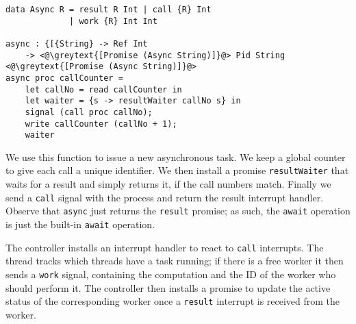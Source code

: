 \documentclass[msc,deptreport,cs]{infthesis} %
\newcommand{\code}[1]{\lstinline{#1}}
\newcommand{\greytext}[1]{\textcolor{black!40}{#1}}
\newcommand{\todo}[1]
           {{\par\noindent\small\color{RoyalPurple}
  \framebox{\parbox{\dimexpr\linewidth-2\fboxsep-2\fboxrule}
    {\textbf{TODO:} #1}}}}
\begin{document}

\begin{lstlisting}
data Async R = result R Int | call {R} Int
             | work {R} Int Int

async : {[{String} -> Ref Int
    -> <@\greytext{[Promise (Async String)]}@> Pid String <@\greytext{[Promise (Async String)]}@>
async proc callCounter =
    let callNo = read callCounter in
    let waiter = {s -> resultWaiter callNo s} in
    signal (call proc callNo);
    write callCounter (callNo + 1);
    waiter
\end{lstlisting}

We use this function to issue a new asynchronous task. We keep a global counter
to give each call a unique identifier. We then install a promise
\code{resultWaiter} that waits for a result and simply returns it, if the call
numbers match. Finally we send a \code{call} signal with the process and return
the result interrupt handler. Observe that \code{async} just returns the
\code{result} promise; as such, the \code{await} operation is just the built-in
\code{await} operation.

The controller installs an interrupt handler to react to \code{call} interrupts.
The thread tracks which threads have a task running; if there is a free worker
it then sends a \code{work} signal, containing the computation and the ID of the
worker who should perform it. The controller then installs a promise to update
the active status of the corresponding worker once a \code{result} interrupt is
received from the worker.




\end{document}
